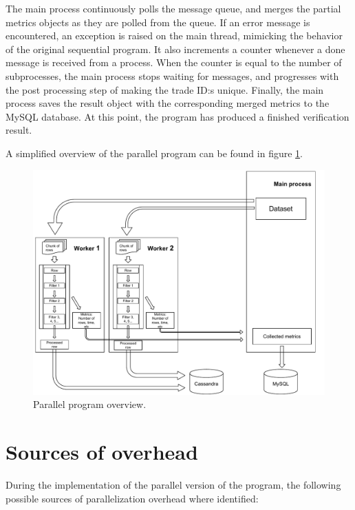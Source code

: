 The main process continuously polls the message queue, and merges the partial metrics objects as they are polled from the queue. If an error message is encountered, an exception is raised on the main thread, mimicking the
behavior of the original sequential program. It also increments a counter whenever a done message is received from a process. When the counter is equal to the number of subprocesses, the main process stops waiting
for messages, and progresses with the post processing step of making the trade ID:s unique. Finally, the main process saves the result object with the corresponding merged metrics to the MySQL database. At this point,
the program has produced a finished verification result.

A simplified overview of the parallel program can be found in figure \ref{fig:parallel_program_overview}.

\begin{figure}
  \centering
  \includegraphics[width=200mm]{figures/program_overview.pdf}
  \caption[Parallel program overview.]{Parallel program overview.}
  \label{fig:parallel_program_overview}
\end{figure}

\section{Sources of overhead}
During the implementation of the parallel version of the program, the following possible sources of parallelization overhead where identified:

